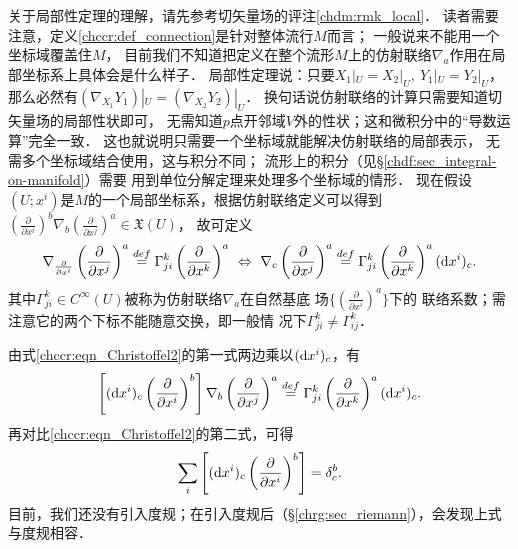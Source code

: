 关于局部性定理的理解，请先参考切矢量场的评注\ref{chdm:rmk_local}．
读者需要注意，定义\ref{chccr:def_connection}是针对整体流行$M$而言；
一般说来不能用一个坐标域覆盖住$M$，
目前我们不知道把定义在整个流形$M$上的仿射联络$\nabla_a$作用在局部坐标系上具体会是什么样子．
{\kaishu 局部性定理}说：只要$X_1|_U =X_2|_U,\ Y_1|_U =Y_2|_U  $，
那么必然有$(\nabla_{X_1} Y_1) |_U=(\nabla_{X_2} Y_2) |_U$．
换句话说仿射联络的计算只需要知道切矢量场的局部性状即可，
无需知道$p$点开邻域$V$外的性状；这和微积分中的“导数运算”完全一致．
这也就说明只需要一个坐标域就能解决仿射联络的局部表示，
无需多个坐标域结合使用，这与积分不同；
流形上的积分（见\S\ref{chdf:sec_integral-on-manifold}）需要
用到单位分解定理来处理多个坐标域的情形．
现在假设$(U;x^i)$是$M$的一个局部坐标系，根据仿射联络定义可以得到
$(\frac{\partial }{\partial x^i}) ^b \nabla_b(\frac{\partial }{\partial x^j}) ^a \in \mathfrak{X}(U)$，
故可定义
\begin{equation}\label{chccr:eqn_Christoffel2}
    \nabla_{\frac{\partial }{\partial x^i}}
    \left(\frac{\partial }{\partial x^j}\right) ^a \overset{def}{=}
    \Gamma^{k}_{ji} \left(\frac{\partial }{\partial x^k}\right) ^a
      \ \Leftrightarrow \ 
    \nabla_c \left(\frac{\partial }{\partial x^j}\right) ^a \overset{def}{=}
    \Gamma^{k}_{ji} \left(\frac{\partial }{\partial x^k}\right) ^a ({\rm d} x^i)_c .
\end{equation} %
其中$\Gamma^{k}_{ji} \in C^\infty(U)$被称为仿射联络$\nabla_a$在自然基底
场$\{(\frac{\partial }{\partial x^i}) ^a\}$下的
{\heiti 联络系数}；需注意它的两个下标不能随意交换，即一般情
况下$\Gamma^{k}_{ji}\neq \Gamma^{k}_{ij}$．

由式\eqref{chccr:eqn_Christoffel2}的第一式两边乘以$({\rm d} x^i)_c$，有
\begin{equation}
    \left[({\rm d} x^i)_c \left(\frac{\partial }{\partial x^i}\right) ^b\right] \nabla_b
    \left(\frac{\partial }{\partial x^j}\right) ^a \overset{def}{=}
    \Gamma^{k}_{ji} \left(\frac{\partial }{\partial x^k}\right) ^a ({\rm d} x^i)_c .
\end{equation}
再对比\eqref{chccr:eqn_Christoffel2}的第二式，可得
\begin{equation}\label{chccr:eqn_deltaac}
    \sum_i \left[({\rm d} x^i)_c \left(\frac{\partial }{\partial x^i}\right) ^b\right] = \delta_c^b .
\end{equation}
目前，我们还没有引入度规；在引入度规后（\S \ref{chrg:sec_riemann}），会发现上式与度规相容．


